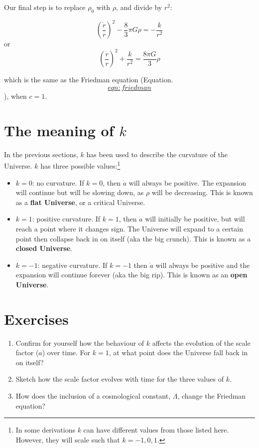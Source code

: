 \documentclass[]{book}
\let\rmarkdownfootnote\footnote%
\def\footnote{\protect\rmarkdownfootnote}
\begin{document}
Our final step is to replace \(\rho_0\) with \(\rho\), and divide by
\(r^2\):

\[\left(\dfrac{\dot{r}}{r}\right)^2 - \dfrac{8}{3}\pi G \rho = -\dfrac{k}{r^2}\]
or
\[\left(\dfrac{\dot{r}}{r}\right)^2 + \dfrac{k}{r^2} = \dfrac{8\pi G}{3}\rho\]

which is the same as the Friedman equation
(Equation.~\protect\hyperlink{eqn:friedman}{\[eqn:friedman\]}), when
\(c=1\).

\hypertarget{sec:curvature}{\section{\texorpdfstring{The meaning of
\(k\)}{The meaning of k}}\label{sec:curvature}}

In the previous sections, \(k\) has been used to describe the curvature
of the Universe. \(k\) has three possible values:\footnote{In some
  derivations \(k\) can have different values from those listed here.
  However, they will scale such that \(k = -1, 0, 1\).}

\begin{itemize}
\item
  \(k = 0\): no curvature. If \(k=0\), then \(\dot{a}\) will always be
  positive. The expansion will continue but will be slowing down, as
  \(\rho\) will be decreasing. This is known as a \textbf{flat
  Universe}, or a critical Universe.
\item
  \(k = 1\): positive curvature. If \(k = 1\), then \(\dot{a}\) will
  initially be positive, but will reach a point where it changes sign.
  The Universe will expand to a certain point then collapse back in on
  itself (aka the big crunch). This is known as a \textbf{closed
  Universe}.
\item
  \(k = -1\): negative curvature. If \(k=-1\) then \(\dot{a}\) will
  always be positive and the expansion will continue forever (aka the
  big rip). This is known as an \textbf{open Universe}.
\end{itemize}

\section{Exercises}\label{sec:geometry_ex}

\begin{enumerate}
\def\labelenumi{\arabic{enumi}.}
\item
  Confirm for yourself how the behaviour of \(k\) affects the evolution
  of the scale factor (\(a\)) over time. For \(k=1\), at what point does
  the Universe fall back in on itself?
\item
  Sketch how the scale factor evolves with time for the three values of
  \(k\).
\item
  How does the inclusion of a cosmological constant, \(\Lambda\), change
  the Friedman equation?
\end{enumerate}
\end{document}
